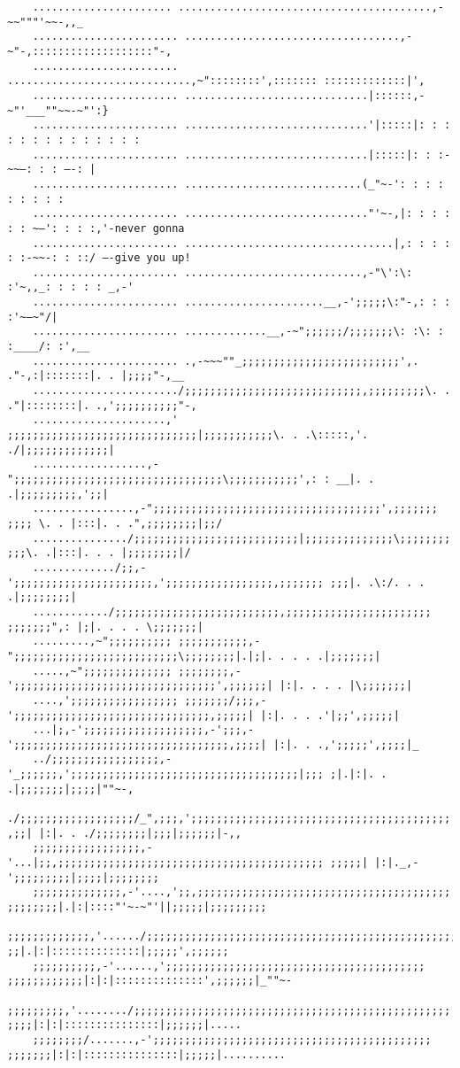 \documentclass[10pt]{article}
\begin{document}
	\begin{verbatim}
	...................... ........................................,-~~"""'~~-,,_
	....................... ..................................,-~"-,:::::::::::::::::::"-,
	....................... .............................,~"::::::::',::::::: :::::::::::::|',
	....................... .............................|::::::,-~"'___""~~-~"':}
	....................... .............................'|:::::|: : : : : : : : : : : : : :
	....................... .............................|:::::|: : :-~~—: : : —-: |
	....................... ............................(_"~-': : : : : : : : :
	....................... ............................."'~-,|: : : : : : ~—': : : :,'-never gonna
	....................... .................................|,: : : : : :-~~-: : ::/ —-give you up!
	....................... ............................,-"\':\: :'~,,_: : : : : _,-'
	....................... ......................__,-';;;;;\:"-,: : : :'~—~"/|
	....................... .............__,-~";;;;;;/;;;;;;;\: :\: : :____/: :',__
	....................... .,-~~~""_;;;;;;;;;;;;;;;;;;;;;;;;;',. ."-,:|:::::::|. . |;;;;"-,__
	......................./;;;;;;;;;;;;;;;;;;;;;;;;;;;;,;;;;;;;;;\. . ."|::::::::|. .,';;;;;;;;;;"-,
	.....................,' ;;;;;;;;;;;;;;;;;;;;;;;;;;;;;;|;;;;;;;;;;;\. . .\:::::,'. ./|;;;;;;;;;;;;;|
	..................,-";;;;;;;;;;;;;;;;;;;;;;;;;;;;;;;;;\;;;;;;;;;;;',: : __|. . .|;;;;;;;;;,';;|
	................,-";;;;;;;;;;;;;;;;;;;;;;;;;;;;;;;;;;;;',;;;;;;; ;;;; \. . |:::|. . .",;;;;;;;;|;;/
	.............../;;;;;;;;;;;;;;;;;;;;;;;;;;|;;;;;;;;;;;;;;\;;;;;;;; ;;;\. .|:::|. . . |;;;;;;;;|/
	............./;;,-';;;;;;;;;;;;;;;;;;;;;;,';;;;;;;;;;;;;;;;;,;;;;;;; ;;;|. .\:/. . . .|;;;;;;;;|
	............/;;;;;;;;;;;;;;;;;;;;;;;;;;,;;;;;;;;;;;;;;;;;;;;;;; ;;;;;;;",: |;|. . . . \;;;;;;;|
	.........,~";;;;;;;;;; ;;;;;;;;;;;,-";;;;;;;;;;;;;;;;;;;;;;;;;;\;;;;;;;;|.|;|. . . . .|;;;;;;;|
	.....,~";;;;;;;;;;;;;; ;;;;;;;;,-';;;;;;;;;;;;;;;;;;;;;;;;;;;;;;;;',;;;;;;| |:|. . . . |\;;;;;;;|
	....,';;;;;;;;;;;;;;;;; ;;;;;;;/;;;,-';;;;;;;;;;;;;;;;;;;;;;;;;;;;;;;,;;;;;| |:|. . . .'|;;',;;;;;|
	...|;,-';;;;;;;;;;;;;;;;;;;,-';;;,-';;;;;;;;;;;;;;;;;;;;;;;;;;;;;;;;;;,;;;;| |:|. . .,';;;;;',;;;;|_
	../;;;;;;;;;;;;;;;;;,-'_;;;;;;,';;;;;;;;;;;;;;;;;;;;;;;;;;;;;;;;;;;;|;;; ;|.|:|. . .|;;;;;;;|;;;;|""~-,
	./;;;;;;;;;;;;;;;;;;/_",;;;,';;;;;;;;;;;;;;;;;;;;;;;;;;;;;;;;;;;;;;;;; ,;;| |:|. . ./;;;;;;;;|;;;|;;;;;;|-,,
	;;;;;;;;;;;;;;;;;,-'...|;;,;;;;;;;;;;;;;;;;;;;;;;;;;;;;;;;;;;;;;;;;;; ;;;;;| |:|._,-';;;;;;;;;|;;;;|;;;;;;;;
	;;;;;;;;;;;;;;,-'....,';;,;;;;;;;;;;;;;;;;;;;;;;;;;;;;;;;;;;;;;;;; ;;;;;;;;|.|:|::::"'~-~"'||;;;;;|;;;;;;;;;
	;;;;;;;;;;;;;,'....../;;;;;;;;;;;;;;;;;;;;;;;;;;;;;;;;;;;;;;;;;;;;;;;;;; ;;|.|:|::::::::::::::|;;;;;',;;;;;;
	;;;;;;;;;;,-'......,';;;;;;;;;;;;;;;;;;;;;;;;;;;;;;;;;;;;;;;;; ;;;;;;;;;;;;|:|:|::::::::::::::',;;;;;;|_""~-
	;;;;;;;;;,'......../;;;;;;;;;;;;;;;;;;;;;;;;;;;;;;;;;;;;;;;;;;;;;;;;;; ;;;;|:|:|:::::::::::::::|;;;;;;|.....
	;;;;;;;;/.......,-';;;;;;;;;;;;;;;;;;;;;;;;;;;;;;;;;;;;;;;;;;;; ;;;;;;;|:|:|:::::::::::::::|;;;;;|..........
	\end{verbatim}
\end{document}
